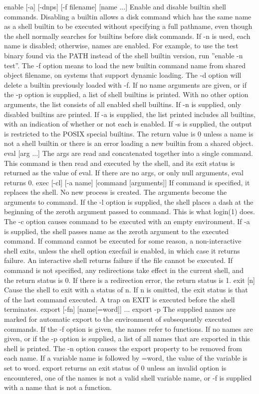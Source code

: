 {enable [-a] [-dnps] [-f filename] [name ...]
Enable and disable builtin shell commands. Disabling a builtin allows a disk command which has the same name as a shell builtin to be executed without specifying a full pathname, even though the shell normally searches for builtins before disk commands. If -n is used, each name is disabled; otherwise, names are enabled. For example, to use the test binary found via the PATH instead of the shell builtin version, run ''enable -n test''. The -f option means to load the new builtin command name from shared object filename, on systems that support dynamic loading. The -d option will delete a builtin previously loaded with -f. If no name arguments are given, or if the -p option is supplied, a list of shell builtins is printed. With no other option arguments, the list consists of all enabled shell builtins. If -n is supplied, only disabled builtins are printed. If -a is supplied, the list printed includes all builtins, with an indication of whether or not each is enabled. If -s is supplied, the output is restricted to the POSIX special builtins. The return value is 0 unless a name is not a shell builtin or there is an error loading a new builtin from a shared object.
eval [arg ...]
The args are read and concatenated together into a single command. This command is then read and executed by the shell, and its exit status is returned as the value of eval. If there are no args, or only null arguments, eval returns 0.
exec [-cl] [-a name] [command [arguments]]
If command is specified, it replaces the shell. No new process is created. The arguments become the arguments to command. If the -l option is supplied, the shell places a dash at the beginning of the zeroth argument passed to command. This is what login(1) does. The -c option causes command to be executed with an empty environment. If -a is supplied, the shell passes name as the zeroth argument to the executed command. If command cannot be executed for some reason, a non-interactive shell exits, unless the shell option execfail is enabled, in which case it returns failure. An interactive shell returns failure if the file cannot be executed. If command is not specified, any redirections take effect in the current shell, and the return status is 0. If there is a redirection error, the return status is 1.
exit [n]
Cause the shell to exit with a status of n. If n is omitted, the exit status is that of the last command executed. A trap on EXIT is executed before the shell terminates.
export [-fn] [name[=word]] ...
export -p
The supplied names are marked for automatic export to the environment of subsequently executed commands. If the -f option is given, the names refer to functions. If no names are given, or if the -p option is supplied, a list of all names that are exported in this shell is printed. The -n option causes the export property to be removed from each name. If a variable name is followed by =word, the value of the variable is set to word. export returns an exit status of 0 unless an invalid option is encountered, one of the names is not a valid shell variable name, or -f is supplied with a name that is not a function.
}
